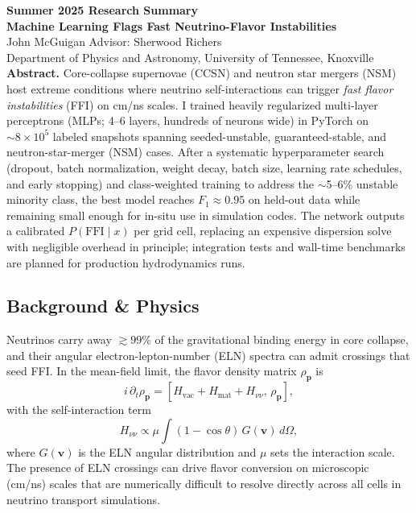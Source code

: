 \documentclass[10pt]{article}
\begin{document}
\begin{center}
{\Large \textbf{Summer 2025 Research Summary}}\\[2pt]
{\large \textbf{Machine Learning Flags Fast Neutrino-Flavor Instabilities}}\\[4pt]
John McGuigan \quad Advisor: Sherwood Richers\\
Department of Physics and Astronomy, University of Tennessee, Knoxville\\

\textbf{Abstract.}
Core-collapse supernovae (CCSN) and neutron star mergers (NSM) host extreme conditions where neutrino self-interactions can trigger \emph{fast flavor instabilities} (FFI) on cm/ns scales.
I trained heavily regularized multi-layer perceptrons (MLPs; 4--6 layers, hundreds of neurons wide) in PyTorch on $\sim 8\times 10^5$ labeled snapshots spanning seeded-unstable, guaranteed-stable, and neutron-star-merger (NSM) cases.
After a systematic hyperparameter search (dropout, batch normalization, weight decay, batch size, learning rate schedules, and early stopping) and class-weighted training to address the $\sim$5--6\% unstable minority class, the best model reaches $F_1 \approx 0.95$ on held-out data while remaining small enough for in-situ use in simulation codes.
The network outputs a calibrated $P(\mathrm{FFI}\mid x)$ per grid cell, replacing an expensive dispersion solve with negligible overhead in principle; integration tests and wall-time benchmarks are planned for production hydrodynamics runs.

\subsection*{Background \& Physics}
Neutrinos carry away $\gtrsim 99\%$ of the gravitational binding energy in core collapse, and their angular electron-lepton-number (ELN) spectra can admit crossings that seed FFI.
In the mean-field limit, the flavor density matrix $\rho_{\mathbf{p}}$ is
\begin{equation*}
i\,\partial_t \rho_{\mathbf{p}} = \left[ H_{\mathrm{vac}} + H_{\mathrm{mat}} + H_{\nu\nu}, \, \rho_{\mathbf{p}} \right],
\end{equation*}
with the self-interaction term
\begin{equation*}
H_{\nu\nu} \propto \mu \!\int (1-\cos\theta)\, G(\mathbf{v})\, d\Omega,
\end{equation*}
where $G(\mathbf{v})$ is the ELN angular distribution and $\mu$ sets the interaction scale. The presence of ELN crossings can drive flavor conversion on microscopic (cm/ns) scales that are numerically difficult to resolve directly across all cells in neutrino transport simulations.


\end{center}
\end{document}
